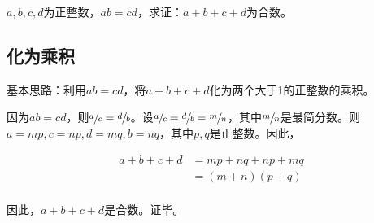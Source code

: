 

$a, b, c, d$为正整数，$ab = cd$，求证：$a + b + c + d$为合数。

\subsection{化为乘积}

基本思路：利用$ab = cd$，将$a + b + c + d$化为两个大于1的正整数的乘积。

因为$ab = cd$，则$\sfrac ac = \sfrac db$。设$\sfrac ac = \sfrac db = \sfrac mn$，其中$\sfrac mn$是最简分数。则$a = mp, c = np, d = mq, b = nq$，其中$p, q$是正整数。因此，

\begin{align*}
  a + b + c + d
  &= mp + nq + np + mq \\
  &= (m + n)(p + q) \\
\end{align*}

因此，$a + b + c + d$是合数。证毕。
